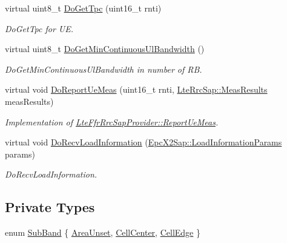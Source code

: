 \begin{DoxyCompactItemize}
virtual uint8\+\_\+t \hyperlink{classns3_1_1LteFrSoftAlgorithm_a460ebad1b6c46148b572858172a90d8b}{Do\+Get\+Tpc} (uint16\+\_\+t rnti)
\begin{DoxyCompactList}\small\item\em Do\+Get\+Tpc for UE. \end{DoxyCompactList}\item 
virtual uint8\+\_\+t \hyperlink{classns3_1_1LteFrSoftAlgorithm_ab9d79477a19755bc9c7d32860c52df51}{Do\+Get\+Min\+Continuous\+Ul\+Bandwidth} ()
\begin{DoxyCompactList}\small\item\em Do\+Get\+Min\+Continuous\+Ul\+Bandwidth in number of RB. \end{DoxyCompactList}\item 
virtual void \hyperlink{classns3_1_1LteFrSoftAlgorithm_ae5a72e11871c5b148a3ba2053642c059}{Do\+Report\+Ue\+Meas} (uint16\+\_\+t rnti, \hyperlink{structns3_1_1LteRrcSap_1_1MeasResults}{Lte\+Rrc\+Sap\+::\+Meas\+Results} meas\+Results)
\begin{DoxyCompactList}\small\item\em Implementation of \hyperlink{classns3_1_1LteFfrRrcSapProvider_aefa0779641b8432a7d3406b519ca7e59}{Lte\+Ffr\+Rrc\+Sap\+Provider\+::\+Report\+Ue\+Meas}. \end{DoxyCompactList}\item 
virtual void \hyperlink{classns3_1_1LteFrSoftAlgorithm_a037cfdbaf0b38aa240f4ab71a8b610ae}{Do\+Recv\+Load\+Information} (\hyperlink{structns3_1_1EpcX2Sap_1_1LoadInformationParams}{Epc\+X2\+Sap\+::\+Load\+Information\+Params} params)
\begin{DoxyCompactList}\small\item\em Do\+Recv\+Load\+Information. \end{DoxyCompactList}\end{DoxyCompactItemize}
\subsection*{Private Types}
\begin{DoxyCompactItemize}
\item 
enum \hyperlink{classns3_1_1LteFrSoftAlgorithm_a8ec0c327bae4119de159dccccb90d029}{Sub\+Band} \{ \hyperlink{classns3_1_1LteFrSoftAlgorithm_a8ec0c327bae4119de159dccccb90d029a1bc0168b37cb032c5efad2869ea950e7}{Area\+Unset}, 
\hyperlink{classns3_1_1LteFrSoftAlgorithm_a8ec0c327bae4119de159dccccb90d029ade368b7d62c45fa8d70158a36f64f360}{Cell\+Center}, 
\hyperlink{classns3_1_1LteFrSoftAlgorithm_a8ec0c327bae4119de159dccccb90d029adf66a42bcef8dc451a9349295ab1401c}{Cell\+Edge}
 \}
\end{DoxyCompactItemize}
